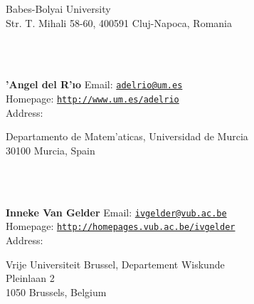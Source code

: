 \documentclass[a4paper,11pt]{report}
\begin{document}
\begin{titlepage}
{\begin{minipage}[t]{8cm}
 Babes-Bolyai University\\
 Str. T. Mihali 58-60, 400591 Cluj-Napoca, Romania \end{minipage}
}\\
{\mbox{}\\
\small \noindent \textbf{{\a'A}ngel del R{\a'\i}o    }  Email: \href{mailto://adelrio@um.es} {\texttt{adelrio@um.es}}\\
  Homepage: \href{http://www.um.es/adelrio} {\texttt{http://www.um.es/adelrio}}\\
  Address: \begin{minipage}[t]{8cm}\noindent
 Departamento de Matem{\a'a}ticas, Universidad de Murcia\\
 30100 Murcia, Spain \end{minipage}
}\\
{\mbox{}\\
\small \noindent \textbf{Inneke Van Gelder    }  Email: \href{mailto://ivgelder@vub.ac.be} {\texttt{ivgelder@vub.ac.be}}\\
  Homepage: \href{http://homepages.vub.ac.be/~ivgelder} {\texttt{http://homepages.vub.ac.be/\texttt{}ivgelder}}\\
  Address: \begin{minipage}[t]{8cm}\noindent
 Vrije Universiteit Brussel, Departement Wiskunde \\
 Pleinlaan 2 \\
 1050 Brussels, Belgium \end{minipage}
}\\
\end{titlepage}
\end{document}
